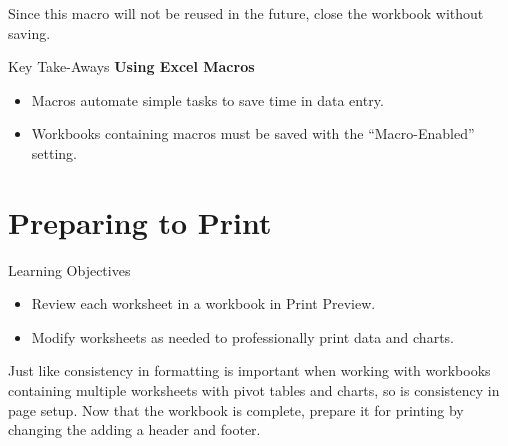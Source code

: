 Since this macro will not be reused in the future, close the workbook without saving.

\begin{center}
	\begin{tkwbox}{Key Take-Aways}
		\textbf{Using Excel Macros}
		\\
		\begin{itemize}
			\setlength{\itemsep}{0pt}
			\setlength{\parskip}{0pt}
			\setlength{\parsep}{0pt}
			
			\item Macros automate simple tasks to save time in data entry.
			\item Workbooks containing macros must be saved with the ``Macro-Enabled'' setting.
			
		\end{itemize}
	\end{tkwbox}
\end{center}

\section{Preparing to Print}

\begin{center}
	\begin{objbox}{Learning Objectives}
		\begin{itemize}
			\setlength{\itemsep}{0pt}
			\setlength{\parskip}{0pt}
			\setlength{\parsep}{0pt}
			
			\item Review each worksheet in a workbook in Print Preview.
			\item Modify worksheets as needed to professionally print data and charts.
			
		\end{itemize}
	\end{objbox}
\end{center}

Just like consistency in formatting is important when working with workbooks containing multiple worksheets with pivot tables and charts,  so is consistency in page setup. Now that the  workbook is complete, prepare it for printing by changing the adding a header and footer. 

